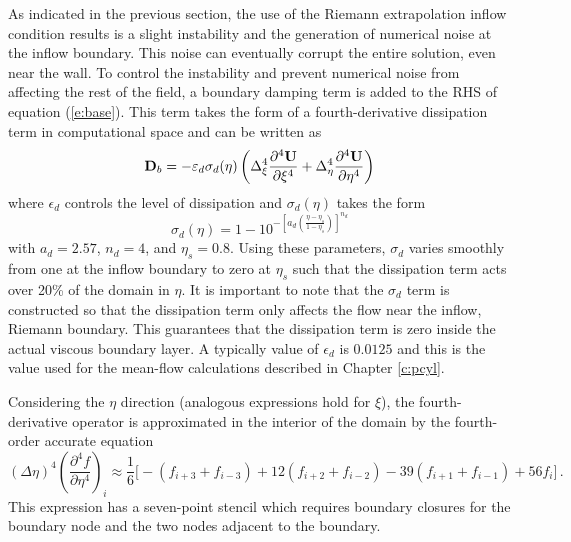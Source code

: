 As indicated in the previous section, the use of the Riemann extrapolation
inflow condition results is a slight instability and the generation of
numerical noise at the inflow boundary.  This noise can eventually corrupt the
entire solution, even near the wall.  To control the instability and prevent
numerical noise from affecting the rest of the field, a boundary damping term
is added to the RHS of equation (\ref{e:base}).  This term takes the form of a
fourth-derivative dissipation term in computational space and can be written
as
%
\begin{equation} \label{e:fourth_diss}
  {\bf D}_b = -\varepsilon_d \sigma_d(\eta) \left( 
          \Delta_\xi^4  \frac{\partial^4 {\bf U}}{\partial \xi^4} + 
          \Delta_\eta^4 \frac{\partial^4 {\bf U}}{\partial \eta^4} \right) 
\end{equation}
%
where $\epsilon_d$ controls the level of dissipation and $\sigma_d(\eta)$
takes the form \cite{GuAd:93}
%
\begin{equation} \label{e:sigma}
  \sigma_d(\eta) = 1 - 10^{-\left[a_d \left( \frac{\eta - \eta_s}
                           {1 - \eta_s} \right) \right]^{n_d} }
\end{equation}
%
with $a_d = 2.57$, $n_d = 4$, and $\eta_s = 0.8$.  Using these parameters,
$\sigma_d$ varies smoothly from one at the inflow boundary to zero at $\eta_s$
such that the dissipation term acts over 20\% of the domain in $\eta$.  It is
important to note that the $\sigma_d$ term is constructed so that the
dissipation term only affects the flow near the inflow, Riemann boundary.
This guarantees that the dissipation term is zero inside the actual viscous
boundary layer.  A typically value of $\epsilon_d$ is $0.0125$ and this is the
value used for the mean-flow calculations described in Chapter \ref{c:pcyl}.

Considering the $\eta$ direction (analogous expressions hold for $\xi$), the
fourth-de\-riv\-a\-tive operator is approximated in the interior of the domain
by the fourth-order accurate equation
%
\begin{equation}
 (\Delta\eta)^4 \left( \frac{\partial^4 f}{\partial \eta^4} \right)_i \approx 
 \frac{1}{6} 
 \Big[  - \left( f_{i+3} + f_{i-3} \right) +
       12 \left( f_{i+2} + f_{i-2} \right) -
       39 \left( f_{i+1} + f_{i-1} \right) +
       56 f_{i} \Big] \period
\end{equation}
%
This expression has a seven-point stencil which requires boundary closures for
the boundary node and the two nodes adjacent to the boundary.  

